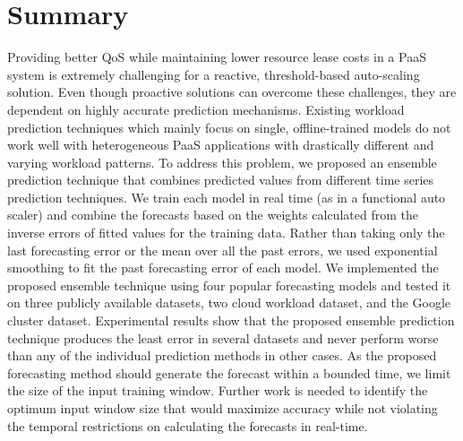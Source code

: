 \section{Summary}

Providing better QoS while maintaining lower resource lease costs in a PaaS system is extremely challenging for a reactive, threshold-based auto-scaling solution. Even though proactive solutions can overcome these challenges, they are dependent on highly accurate prediction mechanisms. Existing workload prediction techniques which mainly focus on single, offline-trained models do not work well with heterogeneous PaaS applications with drastically different and varying workload patterns. To address this problem, we proposed an ensemble prediction technique that combines predicted values from different time series prediction techniques. We train each model in real time (as in a functional auto scaler) and combine the forecasts based on the weights calculated from the inverse errors of fitted values for the training data. Rather than taking only the last forecasting error or the mean over all the past errors, we used exponential smoothing to fit the past forecasting error of each model. We implemented the proposed ensemble technique using four popular forecasting models and tested it on three publicly available datasets, two cloud workload dataset, and the Google cluster dataset. Experimental results show that the proposed ensemble prediction technique produces the least error in several datasets and never perform worse than any of the individual prediction methods in other cases. As the proposed forecasting method should generate the forecast within a bounded time, we limit the size of the input training window. Further work is needed to identify the optimum input window size that would maximize accuracy while not violating the temporal restrictions on calculating the forecasts in real-time.